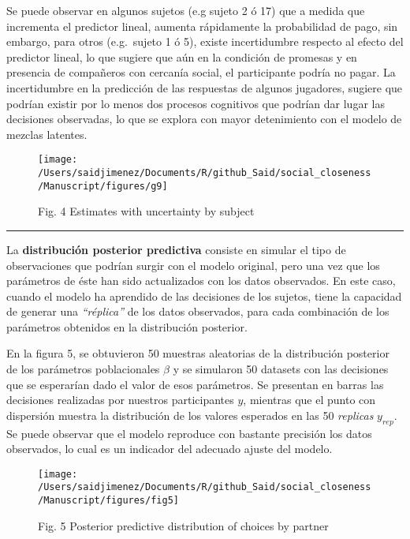 \documentclass[]{article}
\begin{document}
Se puede observar en algunos sujetos (e.g sujeto 2 ó 17) que a medida
que incrementa el predictor lineal, aumenta rápidamente la probabilidad
de pago, sin embargo, para otros (e.g.~sujeto 1 ó 5), existe
incertidumbre respecto al efecto del predictor lineal, lo que sugiere
que aún en la condición de promesas y en presencia de compañeros con
cercanía social, el participante podría no pagar. La incertidumbre en la
predicción de las respuestas de algunos jugadores, sugiere que podrían
existir por lo menos dos procesos cognitivos que podrían dar lugar las
decisiones observadas, lo que se explora con mayor detenimiento con el
modelo de mezclas latentes.

\begin{figure}

{\centering \texttt{[image: /Users/saidjimenez/Documents/R/github\_Said/social\_closeness/Manuscript/figures/g9]} 

}

\caption{Fig. 4 Estimates with uncertainty by subject}\label{fig:fig4}
\end{figure}

\begin{center}\rule{0.5\linewidth}{\linethickness}\end{center}

La \textbf{distribución posterior predictiva} consiste en simular el
tipo de observaciones que podrían surgir con el modelo original, pero
una vez que los parámetros de éste han sido actualizados con los datos
observados. En este caso, cuando el modelo ha aprendido de las
decisiones de los sujetos, tiene la capacidad de generar una
\emph{``réplica''} de los datos observados, para cada combinación de los
parámetros obtenidos en la distribución posterior.

En la figura 5, se obtuvieron 50 muestras aleatorias de la distribución
posterior de los parámetros poblacionales \(\beta\) y se simularon 50
datasets con las decisiones que se esperarían dado el valor de esos
parámetros. Se presentan en barras las decisiones realizadas por
nuestros participantes \(y\), mientras que el punto con dispersión
muestra la distribución de los valores esperados en las 50
\emph{replicas} \(y_{rep}\). Se puede observar que el modelo reproduce
con bastante precisión los datos observados, lo cual es un indicador del
adecuado ajuste del modelo.

\begin{figure}

{\centering \texttt{[image: /Users/saidjimenez/Documents/R/github\_Said/social\_closeness/Manuscript/figures/fig5]} 

}

\caption{Fig. 5 Posterior predictive distribution of choices by partner}\label{fig:fig5}
\end{figure}
\end{document}
